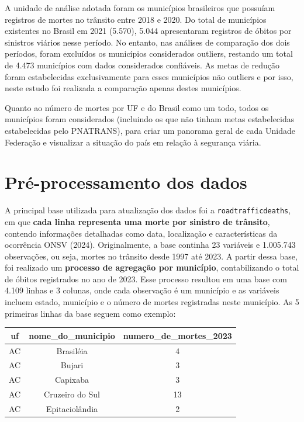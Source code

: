 \documentclass[
  letterpaper,
  DIV=11,
  numbers=noendperiod]{scrreprt}
\begin{document}
A unidade de análise adotada foram os municípios brasileiros que
possuíam registros de mortes no trânsito entre 2018 e 2020. Do total de
municípios existentes no Brasil em 2021 (5.570), 5.044 apresentaram
registros de óbitos por sinistros viários nesse período. No entanto, nas
análises de comparação dos dois períodos, foram excluídos os municípios
considerados outliers, restando um total de 4.473 municípios com dados
considerados confiáveis. As metas de redução foram estabelecidas
exclusivamente para esses municípios não outliers e por isso, neste
estudo foi realizada a comparação apenas destes municípios.

Quanto ao número de mortes por UF e do Brasil como um todo, todos os
municípios foram considerados (incluindo os que não tinham metas
estabelecidas estabelecidas pelo PNATRANS), para criar um panorama geral
de cada Unidade Federação e visualizar a situação do país em relação à
segurança viária.

\section{Pré-processamento dos
dados}\label{pruxe9-processamento-dos-dados}

A principal base utilizada para atualização dos dados foi a
\texttt{roadtrafficdeaths}, em que \textbf{cada linha representa uma
morte por sinistro de trânsito}, contendo informações detalhadas como
data, localização e características da ocorrência ONSV (2024).
Originalmente, a base continha 23 variáveis e 1.005.743 observações, ou
seja, mortes no trânsito desde 1997 até 2023. A partir dessa base, foi
realizado um \textbf{processo de agregação por município},
contabilizando o total de óbitos registrados no ano de 2023. Esse
processo resultou em uma base com 4.109 linhas e 3 colunas, onde cada
observação é um município e as variáveis incluem estado, município e o
número de mortes registradas neste município. As 5 primeiras linhas da
base seguem como exemplo:

\begin{longtable}[]{@{}ccc@{}}
\toprule\noalign{}
uf & nome\_do\_municipio & numero\_de\_mortes\_2023 \\
\midrule\noalign{}
\endhead
\bottomrule\noalign{}
\endlastfoot
AC & Brasiléia & 4 \\
AC & Bujari & 3 \\
AC & Capixaba & 3 \\
AC & Cruzeiro do Sul & 13 \\
AC & Epitaciolândia & 2 \\
\end{longtable}
\end{document}
